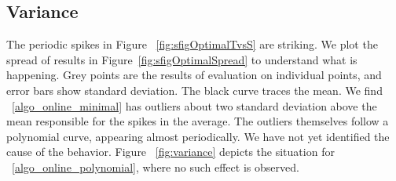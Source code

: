 \documentclass[sigplan]{acmart}
\begin{document}
\subsection{Variance}
The periodic spikes in Figure ~\ref{fig:sfigOptimalTvsS} are striking. 
We plot the spread of results in Figure~\ref{fig:sfigOptimalSpread} to understand what is happening.
Grey points are the results of evaluation on individual points, and error bars show standard deviation. 
The black curve traces the mean.
We find ~\ref{algo_online_minimal} has outliers about two standard deviation above the mean responsible for the spikes in the average.
The outliers themselves follow a polynomial curve, appearing almost periodically.
We have not yet identified the cause of the behavior.
Figure ~\ref{fig:variance} depicts the situation for ~\ref{algo_online_polynomial}, where no such effect is observed.
\end{document}
